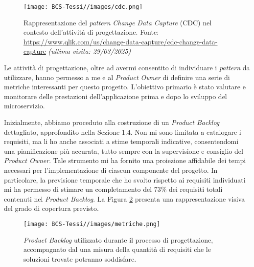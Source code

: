         \begin{figure}[H]
            \centering
            \texttt{[image: BCS-Tessi//images/cdc.png]}
            \caption[Schema del \textit{pattern} \textit{Change Data Capture}]{Rappresentazione del \textit{pattern} \textit{Change Data Capture} (CDC) nel contesto dell'attività di progettazione. Fonte: \href{https://www.qlik.com/us/change-data-capture/cdc-change-data-capture}{https://www.qlik.com/us/change-data-capture/cdc-change-data-capture} \textit{(ultima visita: 29/03/2025)}}
            \label{fig:cdc}
        \end{figure}

        \vspace{0.2 em}
        \noindent Le attività di progettazione, oltre ad avermi consentito di individuare i \textit{pattern} da utilizzare, hanno permesso a me e al \textit{Product Owner} di definire una serie di metriche interessanti per questo progetto. L'obiettivo primario è stato valutare e monitorare delle prestazioni dell'applicazione prima e dopo lo sviluppo del microservizio.

        \vspace{0.2 em}
        \noindent Inizialmente, abbiamo proceduto alla costruzione di un \textit{Product Backlog} dettagliato, approfondito nella Sezione 1.4. Non mi sono limitata a catalogare i requisiti, ma li ho anche associati a stime temporali indicative, consentendomi una pianificazione più accurata, tutto sempre con la supervisione e consiglio del \textit{Product Owner}. Tale strumento mi ha fornito una proiezione affidabile dei tempi necessari per l'implementazione di ciascun componente del progetto. 
        In particolare, la previsione temporale che ho svolto rispetto ai requisiti individuati mi ha permesso di stimare un completamento del 73\% dei requisiti totali contenuti nel \textit{Product Backlog}. La Figura \ref{fig:product-backlog} presenta una rappresentazione visiva del grado di copertura previsto. 

        \begin{figure}[H]
            \centering
            \texttt{[image: BCS-Tessi//images/metriche.png]}
            \caption[\textit{Product Backlog} e delle metriche]{\textit{Product Backlog} utilizzato durante il processo di progettazione, accompagnato dal una misura della quantità di requisiti che le soluzioni trovate potranno soddisfare.}
            \label{fig:product-backlog}
        \end{figure}


